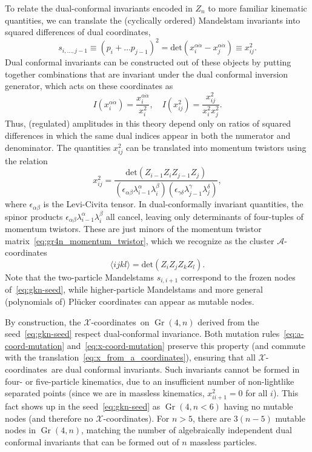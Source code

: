\documentclass[12pt]{article}
\DeclareMathOperator{\Gr}{Gr}
\def\ket#1{\langle #1 \rangle}
\def\xcoords{$\mathcal{X}$-coordinates}
\def\acoords{$\mathcal{A}$-coordinates}
\begin{document}
To relate the dual-conformal invariants encoded in $Z_n$ to more familiar kinematic quantities, we can translate the (cyclically ordered) Mandelstam invariants into squared differences of dual coordinates,
\begin{equation} 
s_{i,\dots,j-1} \equiv (p_i + \dots p_{j-1})^2= \text{det}(x_i^{\alpha \dot \alpha} - x_j^{\alpha \dot \alpha}) \equiv x_{ij}^2. \label{eq:mandelstam_dual_coord}
\end{equation}
Dual conformal invariants can be constructed out of these objects by putting together combinations that are invariant under the dual conformal inversion generator, which acts on these coordinates as
\begin{equation}
I( x_i^{\alpha \dot \alpha}) = \frac{x_i^{\alpha \dot \alpha}}{x_i^2}, \quad  I(x_{ij}^2) = \frac{x_{ij}^2}{x_i^2 x_j^2}.
\end{equation}
Thus, (regulated) amplitudes in this theory depend only on ratios of squared differences in which the same dual indices appear in both the numerator and denominator. The quantities $x_{ij}^2$ can be translated into momentum twistors using the relation
\begin{equation}
x_{ij}^2 = \frac{\text{det}(Z_{i-1} Z_i Z_{j-1} Z_j)}{(\epsilon_{\alpha \beta} \lambda^\alpha_{i-1} \lambda^\beta_i) (\epsilon_{\gamma \delta} \lambda^\gamma_{j-1} \lambda^\delta_j)},
\end{equation}
where $\epsilon_{\alpha \beta}$ is the Levi-Civita tensor. In dual-conformally invariant quantities, the spinor products $\epsilon_{\alpha \beta} \lambda^\alpha_{i-1} \lambda^\beta_i$ all cancel, leaving only determinants of four-tuples of momentum twistors. These are just minors of the momentum twistor matrix~\eqref{eq:gr4n_momentum_twistor}, which we recognize as the cluster \acoords  
\begin{equation}
\ket{i j k l} = \text{det}(Z_i Z_j Z_k Z_l). \label{eq:def_four_bracket}
\end{equation}
Note that the two-particle Mandelstams $s_{i,i+1}$ correspond to the frozen nodes of~\eqref{eq:gkn-seed}, while higher-particle Mandelstams and more general (polynomials of) Pl\"ucker coordinates can appear as mutable nodes.

By construction, the \xcoords\ on $\Gr(4,n)$ derived from the seed~\eqref{eq:gkn-seed} respect dual-conformal invariance. Both mutation rules~\eqref{eq:a-coord-mutation} and~\eqref{eq:x-coord-mutation} preserve this property (and commute with the translation~\eqref{eq:x_from_a_coordinates}), ensuring that all \xcoords\ are dual conformal invariants. Such invariants cannot be formed in four- or five-particle kinematics, due to an insufficient number of non-lightlike separated points (since we are in massless kinematics, $x_{ii+1}^2 = 0$ for all $i$). This fact shows up in the seed~\eqref{eq:gkn-seed} as $\Gr(4,n<6)$ having no mutable nodes (and therefore no \xcoords). For $n>5$, there are $3(n-5)$ mutable nodes in $\Gr(4,n)$, matching the number of algebraically independent dual conformal invariants that can be formed out of $n$ massless particles. 
\end{document}
